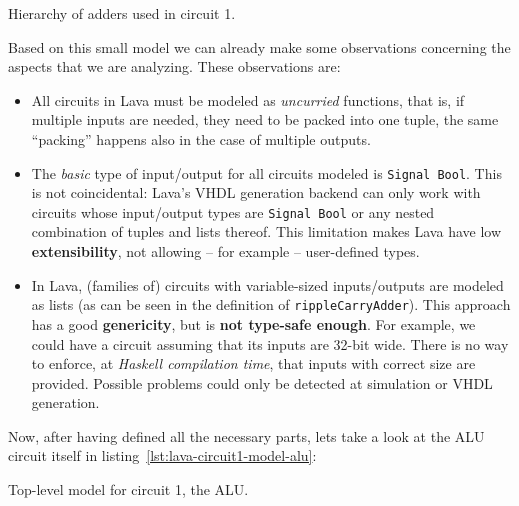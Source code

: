             \begin{listing}[h!]
                \caption{Hierarchy of adders used in circuit 1.
                    \label{lst:lava-circuit1-model-adders}}
            \end{listing}

            Based on this small model we can already make some observations concerning the aspects
            that we are analyzing. These observations are:

            \begin{itemize}
                \item All circuits in Lava must be modeled as \emph{uncurried} functions, that is,
                    if multiple inputs are needed, they need to be packed into one tuple, the same
                    ``packing'' happens also in the case of multiple outputs.

                \item The \emph{basic} type of input/output for all circuits modeled is
                    \texttt{Signal Bool}. This is not coincidental: Lava's VHDL generation backend
                    can only work with circuits whose input/output types are \texttt{Signal Bool} or
                    any nested combination of tuples and lists thereof.  This limitation makes Lava
                    have low \textbf{extensibility}, not allowing -- for example -- user-defined
                    types.

                \item In Lava, (families of) circuits with variable-sized inputs/outputs are modeled
                    as lists (as can be seen in the definition of \texttt{rippleCarryAdder}). This
                    approach has a good \textbf{genericity}, but is \textbf{not type-safe enough}.
                    For example, we could have a circuit assuming that its inputs are 32-bit wide.
                    There is no way to enforce, at \emph{Haskell compilation time}, that inputs with
                    correct size are provided.  Possible problems could only be detected at
                    simulation or VHDL generation.
            \end{itemize}

            Now, after having defined all the necessary parts, lets take a look at the ALU circuit
            itself in listing~\ref{lst:lava-circuit1-model-alu}:

            \begin{listing}[h!]
                \caption{Top-level model for circuit 1, the ALU.
                    \label{lst:lava-circuit1-model-alu}}
            \end{listing}


